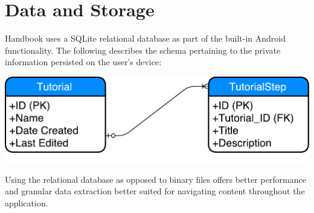 \documentclass[12pt]{article}
\begin{document}
\section{Data and Storage}

Handbook uses a SQLite relational database as part of the built-in Android functionality. The following describes the schema pertaining to the private information persisted on the user's device:

\begin{center}
\includegraphics[scale=0.5]{images/schema.pdf}
\end{center}

Using the relational database as opposed to binary files offers better performance and granular data extraction better suited for navigating content throughout the application.
\end{document}
